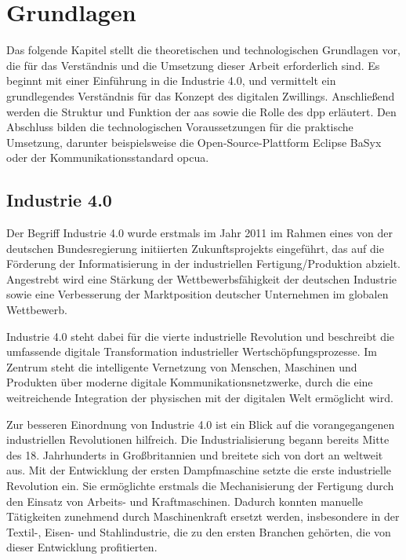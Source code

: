 \newpage
\section{Grundlagen}
Das folgende Kapitel stellt die theoretischen und technologischen Grundlagen vor, die für das Verständnis und die Umsetzung dieser Arbeit erforderlich sind.
Es beginnt mit einer Einführung in die Industrie 4.0, und vermittelt ein grundlegendes Verständnis für das Konzept des digitalen Zwillings.
Anschließend werden die Struktur und Funktion der \acs{aas} sowie die Rolle des \acs{dpp} erläutert.
Den Abschluss bilden die technologischen Voraussetzungen für die praktische Umsetzung, darunter beispielsweise die Open-Source-Plattform Eclipse BaSyx oder der Kommunikationsstandard \ac{opcua}.
\subsection{Industrie 4.0}

Der Begriff Industrie 4.0 wurde erstmals im Jahr 2011 im Rahmen eines von der deutschen Bundesregierung initiierten Zukunftsprojekts eingeführt, das auf die Förderung der Informatisierung in der industriellen Fertigung/Produktion abzielt.
Angestrebt wird eine Stärkung der Wettbewerbsfähigkeit der deutschen Industrie sowie eine Verbesserung der Marktposition deutscher Unternehmen im globalen Wettbewerb.

Industrie 4.0 steht dabei für die vierte industrielle Revolution und beschreibt die umfassende digitale Transformation industrieller Wertschöpfungsprozesse. 
Im Zentrum steht die intelligente Vernetzung von Menschen, Maschinen und Produkten über moderne digitale Kommunikationsnetzwerke, durch die eine weitreichende Integration der physischen mit der digitalen Welt ermöglicht wird.

Zur besseren Einordnung von Industrie 4.0 ist ein Blick auf die vorangegangenen industriellen Revolutionen hilfreich.
Die Industrialisierung begann bereits Mitte des 18. Jahrhunderts in Großbritannien und breitete sich von dort an weltweit aus. 
Mit der Entwicklung der ersten Dampfmaschine setzte die erste industrielle Revolution ein. 
Sie ermöglichte erstmals die Mechanisierung der Fertigung durch den Einsatz von Arbeits- und Kraftmaschinen. 
Dadurch konnten manuelle Tätigkeiten zunehmend durch Maschinenkraft ersetzt werden, insbesondere in der Textil-, Eisen- und Stahlindustrie, die zu den ersten Branchen gehörten, die von dieser Entwicklung profitierten.

